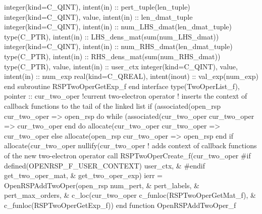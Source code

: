                 integer(kind=C_QINT), intent(in) :: pert_tuple(len_tuple)
                integer(kind=C_QINT), value, intent(in) :: len_dmat_tuple
                integer(kind=C_QINT), intent(in) :: num_LHS_dmat(len_dmat_tuple)
                type(C_PTR), intent(in) :: LHS_dens_mat(sum(num_LHS_dmat))
                integer(kind=C_QINT), intent(in) :: num_RHS_dmat(len_dmat_tuple)
                type(C_PTR), intent(in) :: RHS_dens_mat(sum(num_RHS_dmat))
                type(C_PTR), value, intent(in) :: user_ctx
                integer(kind=C_QINT), value, intent(in) :: num_exp
                real(kind=C_QREAL), intent(inout) :: val_exp(num_exp)
            end subroutine RSPTwoOperGetExp_f
        end interface
        type(TwoOperList_f), pointer :: cur_two_oper  !current two-electron operator
        ! inserts the context of callback functions to the tail of the linked list
        if (associated(open_rsp%
            cur_two_oper => open_rsp%
            do while (associated(cur_two_oper%
                cur_two_oper => cur_two_oper%
            end do
            allocate(cur_two_oper%
            cur_two_oper => cur_two_oper%
        else
            allocate(open_rsp%
            cur_two_oper => open_rsp%
        end if
        allocate(cur_two_oper%
        nullify(cur_two_oper%
        ! adds context of callback functions of the new two-electron operator
        call RSPTwoOperCreate_f(cur_two_oper%
#if defined(OPENRSP_F_USER_CONTEXT)
                                user_ctx,                  &
#endif
                                get_two_oper_mat,          &
                                get_two_oper_exp)
        ierr = OpenRSPAddTwoOper(open_rsp%
                                 num_pert,                         &
                                 pert_labels,                      &
                                 pert_max_orders,                  &
                                 c_loc(cur_two_oper%
                                 c_funloc(RSPTwoOperGetMat_f),     &
                                 c_funloc(RSPTwoOperGetExp_f))
    end function OpenRSPAddTwoOper_f


